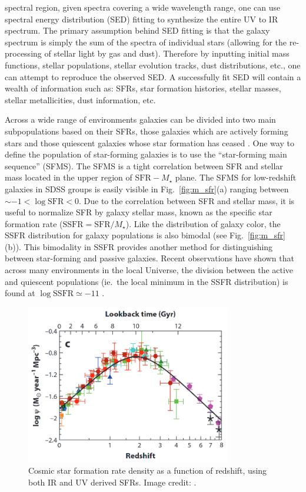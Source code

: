 spectral region, given spectra covering a wide wavelength range, one
can use spectral energy distribution (SED) fitting to synthesize the
entire UV to IR spectrum.  The primary assumption behind SED fitting
is that the galaxy spectrum is simply the sum of the spectra of
individual stars (allowing for the re-processing of stellar light by
gas and dust).  Therefore by inputting initial mass functions, stellar
populations, stellar evolution tracks, dust distributions, etc.,
one can attempt to reproduce the observed SED.  A successfully fit SED
will contain a wealth of information such as: SFRs, star formation
histories, stellar masses, stellar metallicities, dust information, etc.
\par
Across a wide range of environments galaxies
can be divided into two main subpopulations based on their SFRs, those
galaxies which are actively forming stars and those quiescent galaxies
whose star formation has ceased \citep{wetzel2012}.  One way to
define the population of star-forming galaxies is to use the
``star-forming main sequence'' (SFMS).  The SFMS is a tight
correlation between SFR and stellar mass located in the upper region
of $\mathrm{SFR} - M_\star$ plane.  The SFMS for low-redshift galaxies
in SDSS groups is easily visible in Fig.~\ref{fig:m_sfr}(a) ranging
between $\sim -1 < \log \mathrm{SFR} < 0$.  Due to the correlation
between SFR and stellar mass, it is useful to normalize SFR by galaxy
stellar mass, known as the specific star formation rate
($\mathrm{SSFR} = \mathrm{SFR}/M_\star$).  Like the distribution of
galaxy color, the SSFR distribution for galaxy populations is also
bimodal (see Fig.~\ref{fig:m_sfr}(b)).  This bimodality in SSFR
provides another method for distinguishing between star-forming and
passive galaxies.  Recent observations have shown that across
many environments in the local Universe, the division between
the active and quiescent populations (ie.\ the local minimum in the
SSFR distribution) is found at $\log \mathrm{SSFR} \simeq -11$
\citep{wetzel2012}.

\begin{figure}[!ht]
  \centering
  \includegraphics[width=0.8\textwidth]{lilly_madau.png}
  \caption[Cosmic SFR density versus redshift]{Cosmic star formation
    rate density as a function of 
    redshift, using both IR and UV derived SFRs.  Image credit:
    \citet{madau2014}.}
  \label{fig:lilly_madau}
\end{figure}

